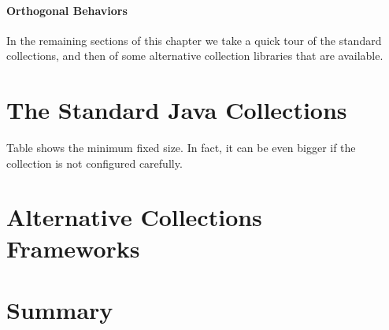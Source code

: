 \paragraph{Orthogonal Behaviors}

In the remaining sections of this chapter we take a quick tour of the standard
collections, and then of some alternative collection libraries that are
available.

\section{The Standard Java Collections}
Table shows the minimum fixed size.  In fact, it can be even bigger if the
collection is not configured carefully.
\section{Alternative Collections Frameworks}

\section{Summary}

